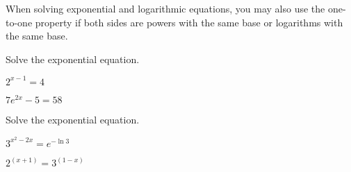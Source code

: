 	\begin{note}
		When solving exponential and logarithmic equations, you may also use the one-to-one property if both sides are powers with the same base or logarithms with the same base.
	\end{note}
\newpage


\begin{exercise}
	Solve the exponential equation.
	
	\begin{enumerate*}[label={(\arabic*)~}]
		\item $2^{x-1}=4$
		\item $7e^{2x}-5=58$
		\hfill\null
	\end{enumerate*}
\end{exercise}
\vfill
\begin{center} \hfill
\end{center}


\begin{exercise}
	Solve the exponential equation.
	
	\begin{enumerate*}[label={(\arabic*)~}]
		\item $3^{x^2-2x}=e^{-\ln3}$
		\item $2^{(x+1)}=3^{(1-x)}$
		\hfill\null
	\end{enumerate*}
\end{exercise}
\vfill
\begin{center} \hfill
\end{center}

\newpage

